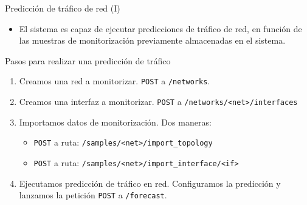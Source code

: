 \documentclass[aspectratio=169,xcolor=dvipsnames]{beamer}
\begin{document}
	\begin{frame}{Predicción de tráfico de red (I)}
		\begin{itemize}
			\item El sistema es capaz de ejecutar predicciones de tráfico de red, en función de las muestras de monitorización previamente almacenadas en el sistema.
		\end{itemize}
	
		\begin{exampleblock}{Pasos para realizar una predicción de tráfico}
			\begin{enumerate}
				\item Creamos una red a monitorizar. \texttt{POST} a \texttt{/networks}.
				
				\item Creamos una interfaz a monitorizar. \texttt{POST} a \texttt{/networks/<net>/interfaces}
				
				\item Importamos datos de monitorización.  Dos maneras: 
				\begin{itemize}
					\item \texttt{POST} a ruta: \texttt{/samples/<net>/import\_topology}
					
					\item \texttt{POST} a ruta: \texttt{/samples/<net>/import\_interface/<if>}
				\end{itemize}
			
				\item Ejecutamos predicción de tráfico en red. Configuramos la predicción y lanzamos la petición \texttt{POST} a \texttt{/forecast}.
			\end{enumerate}
		\end{exampleblock}
	\end{frame}
	
	
\end{document}
